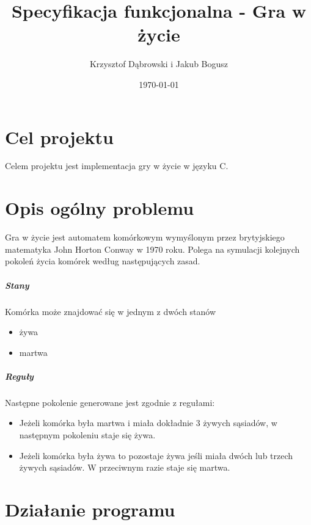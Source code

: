 \documentclass{report}
\title{Specyfikacja funkcjonalna - Gra w życie}
\author{Krzysztof Dąbrowski i Jakub Bogusz}
\date{\today}
\begin{document}
\maketitle{}

\tableofcontents{}

\chapter{Cel projektu}
Celem projektu jest implementacja gry w życie w języku C.

\chapter{Opis ogólny problemu}
Gra w życie jest automatem komórkowym wymyślonym przez brytyjskiego matematyka John Horton Conway %
w 1970 roku. Polega na symulacji kolejnych pokoleń życia komórek według następujących zasad.


\paragraph{Stany}  Komórka może znajdować się w jednym z dwóch stanów
\begin{itemize}
\item żywa
\item martwa
\end{itemize}

\paragraph{Reguły} Następne pokolenie generowane jest zgodnie z regułami:
\begin{itemize}
\item Jeżeli komórka była martwa i miała dokładnie 3 żywych sąsiadów, w następnym pokoleniu staje się żywa.
\item Jeżeli komórka była żywa to pozostaje żywa jeśli miała dwóch lub trzech żywych sąsiadów. W przeciwnym razie staje się martwa.
\end{itemize}

\chapter{Działanie programu}
\end{document}
